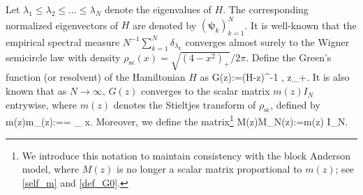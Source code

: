  

Let \( \lambda_1 \leq \lambda_2 \leq \dots \leq \lambda_N \) denote the eigenvalues of \( H \). The corresponding normalized eigenvectors of $H$ are denoted by \( \left( \boldsymbol{\psi}_k \right)_{k=1}^N \). 
It is well-known that the empirical spectral measure $N^{-1}\sum_{k=1}^N \delta_{\lambda_k}$ converges almost surely to the Wigner semicircle law \cite{Wigner} with density 
\(
\rho_{\mathrm{sc}}(x) = \sqrt{(4 - x^2)_+}/{2\pi}.
\)
Define the Green's function (or resolvent) of the Hamiltonian $H$ as
\be\label{def_Green}
G(z):=(H-z)^{-1} ,  \quad z\in \C_+.
\ee
It is also known that as $N\to \infty$, $G(z)$ converges to the scalar matrix $m(z)I_N$ entrywise, where $m(z)$ denotes the Stieltjes transform of \( \rho_{\mathrm{sc}} \), defined by
\be\label{eq:defmzsc}
m(z)\equiv m_{}(z):== \int_{}  \dd x.
\ee
Moreover, we define the matrix\footnote{We introduce this notation to maintain consistency with the block Anderson model, where $M(z)$ is no longer a scalar matrix proportional to $m(z)$; see \eqref{self_m} and \eqref{def_G0}.}
\be\label{eq:defMzsc} 
M(z)\equiv M_N(z):=m(z) I_N. 
\ee


